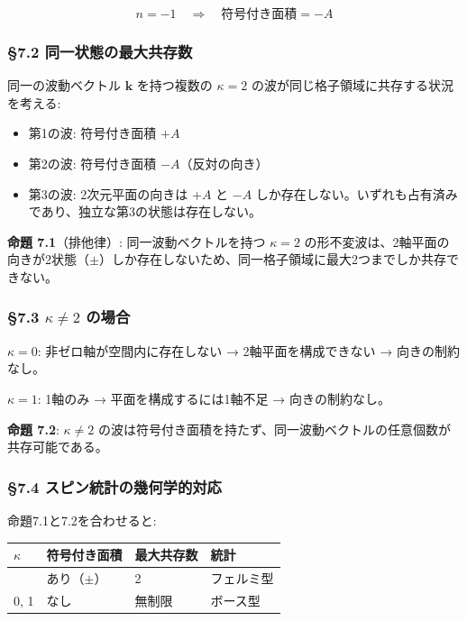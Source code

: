 \documentclass[
  a4paper,11pt]{ltjsarticle}
\newcounter{none}
\providecommand{\tightlist}{%
  \setlength{\itemsep}{0pt}\setlength{\parskip}{0pt}}
\theoremstyle{definition}
\theoremstyle{remark}
\begin{document}
\[n = -1 \quad \Rightarrow \quad \text{符号付き面積} = -A\]

\subsubsection{§7.2
同一状態の最大共存数}\label{ux540cux4e00ux72b6ux614bux306eux6700ux5927ux5171ux5b58ux6570}

同一の波動ベクトル \(\mathbf{k}\) を持つ複数の \(\kappa = 2\)
の波が同じ格子領域に共存する状況を考える:

\begin{itemize}
\tightlist
\item
  第1の波: 符号付き面積 \(+A\)
\item
  第2の波: 符号付き面積 \(-A\)（反対の向き）
\item
  第3の波: 2次元平面の向きは \(+A\) と \(-A\)
  しか存在しない。いずれも占有済みであり、独立な第3の状態は存在しない。
\end{itemize}

\textbf{命題 7.1}（排他律）: 同一波動ベクトルを持つ \(\kappa = 2\)
の形不変波は、2軸平面の向きが2状態（\(\pm\)）しか存在しないため、同一格子領域に最大2つまでしか共存できない。

\subsubsection{\texorpdfstring{§7.3 \(\kappa \neq 2\)
の場合}{§7.3 \textbackslash kappa \textbackslash neq 2 の場合}}\label{kappa-neq-2-ux306eux5834ux5408}

\(\kappa = 0\): 非ゼロ軸が空間内に存在しない → 2軸平面を構成できない →
向きの制約なし。

\(\kappa = 1\): 1軸のみ → 平面を構成するには1軸不足 → 向きの制約なし。

\textbf{命題 7.2}: \(\kappa \neq 2\)
の波は符号付き面積を持たず、同一波動ベクトルの任意個数が共存可能である。

\subsubsection{§7.4
スピン統計の幾何学的対応}\label{ux30b9ux30d4ux30f3ux7d71ux8a08ux306eux5e7eux4f55ux5b66ux7684ux5bfeux5fdc}

命題7.1と7.2を合わせると:

{\def\LTcaptype{none} %
\begin{longtable}[]{@{}llll@{}}
\toprule\noalign{}
\(\kappa\) & 符号付き面積 & 最大共存数 & 統計 \\
\midrule\noalign{}
\endhead
\bottomrule\noalign{}
\endlastfoot
2 & あり（\(\pm\)） & 2 & フェルミ型 \\
0, 1 & なし & 無制限 & ボース型 \\
\end{longtable}
}
\end{document}
